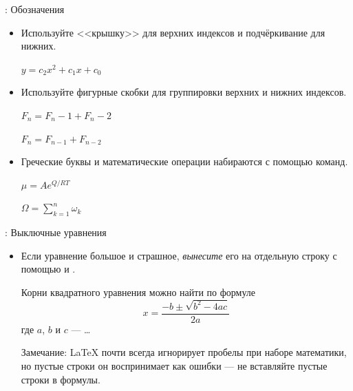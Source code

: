 \documentclass{beamer}
\begin{document}
\begin{frame}[fragile]{\insertsubsection{}: Обозначения}
\vspace{-3ex}
\begin{itemize}
\item Используйте <<крышку>>  для верхних индексов и
  подчёркивание \keystrokebftt{\_} для нижних.

\begin{exampletwouptiny}
$y = c_2 x^2 + c_1 x + c_0$
\end{exampletwouptiny}

\item Используйте фигурные скобки \keystrokebftt{\{} \keystrokebftt{\}} для
группировки верхних и нижних индексов.

\begin{exampletwouptiny}
$F_n = F_n-1 + F_n-2$ %

$F_n = F_{n-1} + F_{n-2}$
\end{exampletwouptiny}

\item Греческие буквы и математические операции набираются с помощью команд.

\begin{exampletwouptiny}
$\mu = A e^{Q/RT}$

$\Omega =
  \sum_{k=1}^{n} \omega_k$
\end{exampletwouptiny}
\end{itemize}
\end{frame}

\begin{frame}[fragile]{\insertsubsection{}: Выключные уравнения}
\begin{itemize}
  \item Если уравнение большое и страшное, \emph{вынесите} его на отдельную
    строку с помощью
 и .
\vspace{1ex}
\begin{exampletwouptiny}
Корни квадратного уравнения
можно найти по формуле
\begin{equation}
x =
\frac{-b \pm\sqrt{b^2 - 4ac}}
     {2a}
\end{equation}
где $a$, $b$ и $c$ --- \dots
\end{exampletwouptiny}

{\scriptsize Замечание: \LaTeX{} почти всегда игнорирует пробелы при наборе
  математики, но пустые строки он воспринимает как ошибки --- не вставляйте
  пустые строки в формулы.}
\end{itemize}
\end{frame}
\end{document}
